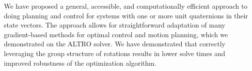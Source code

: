 \documentclass[letterpaper, 10 pt, conference]{ieeeconf}  %
\newcommand{\R}{\mathbb{R}}
\newcommand{\q}{\textbf{q}}
\begin{document}
    We have proposed a general, accessible, and computationally efficient approach to
    doing planning and control for systems with one or more unit quaternions in their
    state vectors. The approach allows for straightforward adaptation of many
    gradient-based methods for optimal control and motion planning, which we demonstrated
    on the ALTRO solver. We have demonstrated that correctly leveraging the group
    structure of rotations results in lower solve times and improved robustness of the
    optimization algorithm.

        
    
\end{document}
